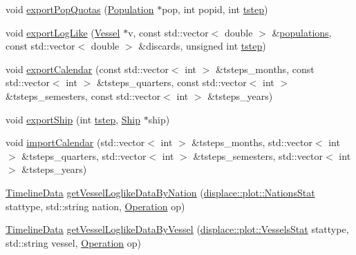 \begin{DoxyCompactItemize}
\item 
void \mbox{\hyperlink{class_s_q_lite_output_storage_a3e017d586cf80142baef2fdc1e7318ef}{export\+Pop\+Quotas}} (\mbox{\hyperlink{class_population}{Population}} $\ast$pop, int popid, int \mbox{\hyperlink{thread__vessels_8cpp_a84bc73d278de929ec9974e1a95d9b23a}{tstep}})
\item 
void \mbox{\hyperlink{class_s_q_lite_output_storage_ab7d95ccbd7baf589d2c65ef0539bac08}{export\+Log\+Like}} (\mbox{\hyperlink{class_vessel}{Vessel}} $\ast$v, const std\+::vector$<$ double $>$ \&\mbox{\hyperlink{thread__vessels_8cpp_a52b340841e812112c424c384bb9e7ebc}{populations}}, const std\+::vector$<$ double $>$ \&discards, unsigned int \mbox{\hyperlink{thread__vessels_8cpp_a84bc73d278de929ec9974e1a95d9b23a}{tstep}})
\item 
void \mbox{\hyperlink{class_s_q_lite_output_storage_a4393d923aa9f3a01c3d259c8a30eee88}{export\+Calendar}} (const std\+::vector$<$ int $>$ \&tsteps\+\_\+months, const std\+::vector$<$ int $>$ \&tsteps\+\_\+quarters, const std\+::vector$<$ int $>$ \&tsteps\+\_\+semesters, const std\+::vector$<$ int $>$ \&tsteps\+\_\+years)
\item 
void \mbox{\hyperlink{class_s_q_lite_output_storage_ab963baf95a340d450b308cdf7e48e34a}{export\+Ship}} (int \mbox{\hyperlink{thread__vessels_8cpp_a84bc73d278de929ec9974e1a95d9b23a}{tstep}}, \mbox{\hyperlink{class_ship}{Ship}} $\ast$ship)
\item 
void \mbox{\hyperlink{class_s_q_lite_output_storage_a90df0d3b8e9c4ddbd6e899160403a14e}{import\+Calendar}} (std\+::vector$<$ int $>$ \&tsteps\+\_\+months, std\+::vector$<$ int $>$ \&tsteps\+\_\+quarters, std\+::vector$<$ int $>$ \&tsteps\+\_\+semesters, std\+::vector$<$ int $>$ \&tsteps\+\_\+years)
\item 
\mbox{\hyperlink{struct_timeline_data}{Timeline\+Data}} \mbox{\hyperlink{class_s_q_lite_output_storage_a18aba30ce88988bb86cb79fe20a9e0f9}{get\+Vessel\+Loglike\+Data\+By\+Nation}} (\mbox{\hyperlink{namespacedisplace_1_1plot_ab7b96ae3ae291a71823f371d77f27d98}{displace\+::plot\+::\+Nations\+Stat}} stattype, std\+::string nation, \mbox{\hyperlink{class_s_q_lite_output_storage_aa3928d8e7ab04aafef854a63a94222eb}{Operation}} op)
\item 
\mbox{\hyperlink{struct_timeline_data}{Timeline\+Data}} \mbox{\hyperlink{class_s_q_lite_output_storage_a22263f77a737990d78c5606cac61d0d4}{get\+Vessel\+Loglike\+Data\+By\+Vessel}} (\mbox{\hyperlink{namespacedisplace_1_1plot_aa453098d286017edd5b0ff3f15ba1013}{displace\+::plot\+::\+Vessels\+Stat}} stattype, std\+::string vessel, \mbox{\hyperlink{class_s_q_lite_output_storage_aa3928d8e7ab04aafef854a63a94222eb}{Operation}} op)

\end{DoxyCompactItemize}

